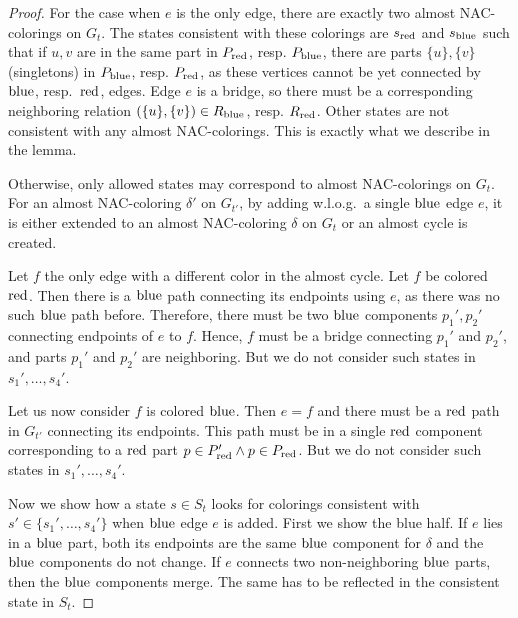 %
\begin{proof}
	For the case when \( e \) is the only edge,
	there are exactly two almost NAC-colorings on \( G_t \).
	The states consistent with these colorings are \( s_{\text{red}} \) and \( s_{\text{blue}} \)
	such that if \( u, v \) are in the same part in \( P_{\text{red}} \), resp. \( P_{\text{blue}} \),
	there are parts \( \{u\}, \{v\} \) (singletons) in \( P_{\text{blue}} \), resp. \( P_{\text{red}} \),
	as these vertices cannot be yet connected by \( \text{blue} \), resp.\ \( \text{red} \), edges.
	Edge \( e \) is a bridge, so there must be a corresponding neighboring
	relation \( (\{u\}, \{v\}) \in R_{\text{blue}} \), resp. \( R_{\text{red}} \).
	Other states are not consistent with any almost NAC-colorings.
	This is exactly what we describe in the lemma.

	Otherwise, only allowed states may correspond to almost NAC-colorings on \( G_t \).
	For an almost NAC-coloring \( \delta' \) on \( G_{t'} \),
	by adding w.l.o.g.\ a single \( \text{blue} \) edge \( e \),
	it is either extended to an almost NAC-coloring \( \delta \) on \( G_t \)
	or an almost cycle is created.

	Let \( f \) the only edge with a different color in the almost cycle.
	Let \( f \) be colored \( \text{red} \).
	Then there is a \( \text{blue} \) path connecting its endpoints using \( e \),
	as there was no such \( \text{blue} \) path before.
	Therefore, there must be two \( \text{blue} \) components \( p_1', p_2' \)
	connecting endpoints of \( e \) to \( f \).
	Hence, \( f \) must be a bridge connecting \( p_1' \) and \( p_2' \),
	and parts \( p_1' \) and \( p_2' \) are neighboring.
	But we do not consider such states in \( s_1', \dots, s_4' \).

	Let us now consider \( f \) is colored \( \text{blue} \).
	Then \( e = f \) and
	there must be a \( \text{red} \) path in \( G_{t'} \) connecting its endpoints.
	This path must be in a single \( \text{red} \) component corresponding
	to a \( \text{red} \) part \( p \in P_{\text{red}}' \land p \in P_{\text{red}} \).
	But we do not consider such states in \( s_1', \dots, s_4' \).

	Now we show how a state \( s \in S_t \) looks
	for colorings consistent with \( s' \in \{s_1', \dots, s_4'\} \)
	when \( \text{blue} \) edge \( e \) is added.
	First we show the blue half.
	If \( e \) lies in a \( \text{blue} \) part,
	both its endpoints are the same \( \text{blue} \) component
	for \( \delta \) and the \( \text{blue} \) components do not change.
	If \( e \) connects two non-neighboring \( \text{blue} \) parts,
	then the \( \text{blue} \) components merge. The same has to be reflected in
	the consistent state in \( S_t \).


\end{proof}
